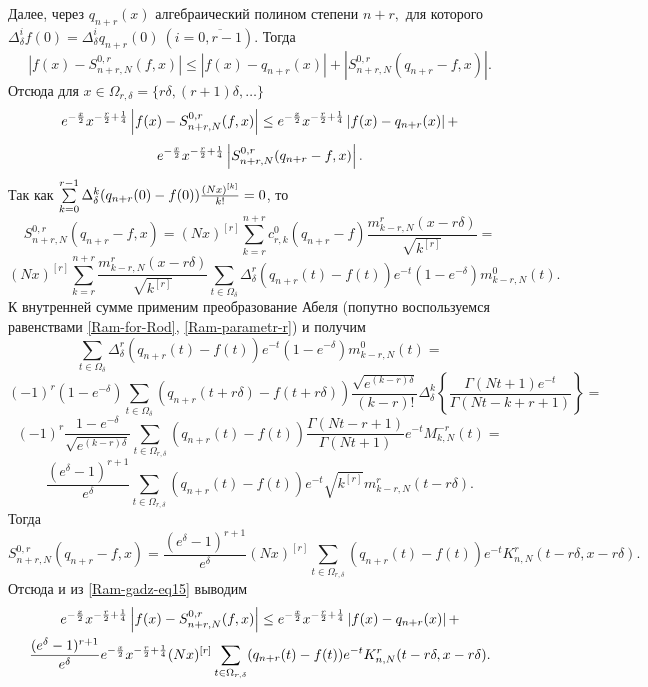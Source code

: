 Далее, через $q_{n+r}(x)$ алгебраический полином степени $n+r,$ для которого
$
\Delta^i_\delta f(0)=\Delta^i_\delta q_{n+r}(0)\ (i=\overline{0, r-1}).
$
Тогда
$$
\left|f(x)-S_{n+r,N}^{0,r}(f,x)\right|\leq\left|f(x)-q_{n+r}(x)\right|+\left|S_{n+r,N}^{0,r}(q_{n+r}-f,x)\right|.
$$
Отсюда для $x\in\Omega_{r,\delta}=\{r\delta, (r+1)\delta, \ldots\}$
$$
e^{-{x\over 2}}x^{-{r\over 2}+{1\over 4}}\left|f(x)-S_{n+r,N}^{0,r}(f,x)\right|\leq e^{-{x\over 2}}x^{-{r\over 2}+{1\over 4}}\left|f(x)-q_{n+r}(x)\right|+
$$
\begin{equation}\label{Ram-gadz-eq15}
e^{-{x\over 2}}x^{-{r\over 2}+{1\over 4}}\left|S_{n+r,N}^{0,r}(q_{n+r}-f,x)\right|.
\end{equation}
Так как $\sum\limits_{k=0}^{r-1}\Delta_\delta^k(q_{n+r}(0)-f(0)){(Nx)^{[k]}\over k!}=0$, то
$$
S_{n+r,N}^{0,r}(q_{n+r}-f,x)=
(Nx)^{[r]}\sum_{k=r}^{n+r}c_{r,k}^0(q_{n+r}-f) \frac{m^{r}_{k-r,N}(x-r\delta)}{\sqrt{k^{[r]}}}=
$$
$$
(Nx)^{[r]}\sum_{k=r}^{n+r}\frac{m^{r}_{k-r,N}(x-r\delta)}{\sqrt{k^{[r]}}}
\sum_{t\in\Omega_{\delta}}\Delta_\delta^r(q_{n+r}(t)-f(t))e^{-t}(1-e^{-\delta})m_{k-r,N}^0(t).
$$
К внутренней сумме применим преобразование Абеля (попутно воспользуемся равенствами \eqref{Ram-for-Rod}, \eqref{Ram-parametr-r}) и получим
$$
\sum_{t\in\Omega_{\delta}}\Delta_\delta^r(q_{n+r}(t)-f(t))e^{-t}(1-e^{-\delta})m_{k-r,N}^0(t)=
$$
$$
(-1)^r(1-e^{-\delta})\sum_{t\in\Omega_{\delta}}(q_{n+r}(t+r\delta)-f(t+r\delta))\frac{\sqrt{e^{(k-r)\delta}}}{(k-r)!}
\Delta_\delta^k\left\{\frac{\Gamma(Nt+1)e^{-t}}{\Gamma(Nt-k+r+1)}\right\}=
$$
$$
(-1)^r\frac{1-e^{-\delta}}{\sqrt{e^{(k-r)\delta}}}\sum_{t\in\Omega_{r,\delta}}(q_{n+r}(t)-f(t))\frac{\Gamma(Nt-r+1)}{\Gamma(Nt+1)}e^{-t}M_{k,N}^{-r}(t)=
$$
$$
\frac{(e^{\delta}-1)^{r+1}}{e^\delta}\sum_{t\in\Omega_{r,\delta}}(q_{n+r}(t)-f(t))e^{-t}\sqrt{k^{[r]}}m_{k-r,N}^{r}(t-r\delta).
$$
Тогда
$$
S_{n+r,N}^{0,r}(q_{n+r}-f,x)=\frac{(e^{\delta}-1)^{r+1}}{e^\delta}(Nx)^{[r]}\sum_{t\in\Omega_{r,\delta}}(q_{n+r}(t)-f(t))e^{-t}K_{n,N}^r(t-r\delta,x-r\delta).
$$
Отсюда и из \eqref{Ram-gadz-eq15} выводим
\begin{multline}\label{Ram-gadz-eq16}
e^{-{x\over 2}}x^{-{r\over 2}+{1\over 4}}\left|f(x)-S_{n+r,N}^{0,r}(f,x)\right|\leq e^{-{x\over 2}}x^{-{r\over 2}+{1\over 4}}\left|f(x)-q_{n+r}(x)\right|+\\
\frac{(e^{\delta}-1)^{r+1}}{e^\delta}e^{-{x\over 2}}x^{-{r\over 2}+{1\over 4}}(Nx)^{[r]}\sum_{t\in\Omega_{r,\delta}}(q_{n+r}(t)-f(t))e^{-t}K_{n,N}^r(t-r\delta,x-r\delta).
\end{multline}

